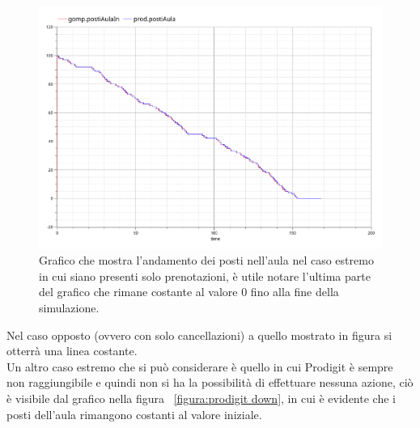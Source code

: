 \begin{figure}[htp]
\begin{center}
  \includegraphics[width=1 \textwidth]{Figure/studente solo prenotazioni.pdf}
    \caption{Grafico che mostra l’andamento dei posti nell’aula nel caso estremo in cui siano presenti solo prenotazioni, è utile notare  l’ultima parte del grafico che rimane costante al valore 0 fino alla fine della simulazione.} \label{figura: solo prenotazioni}
\end{center}
\end{figure}

Nel caso opposto (ovvero con solo cancellazioni) a quello mostrato in figura si otterrà una linea costante.\\

Un altro caso estremo che si può considerare è quello in cui Prodigit è sempre non raggiungibile e quindi non si ha la possibilità di effettuare nessuna azione, ciò è visibile dal grafico nella figura ~\ref{figura:prodigit down}, in cui è evidente che i posti dell’aula rimangono  costanti al valore iniziale.

